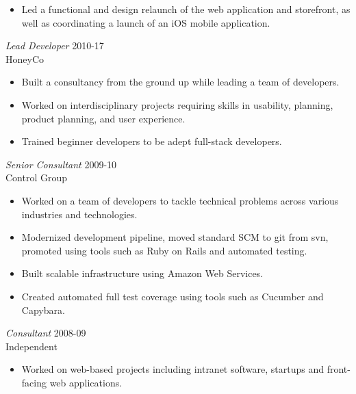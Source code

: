 \documentclass[line,margin]{res}
\begin{document}
\begin{resume}
\begin{itemize}
        \item
              Led a functional and design relaunch of the web
              application and storefront, as well as coordinating
              a launch of an iOS mobile application.
    \end{itemize}

    {\sl Lead Developer}
    \hfill 2010-17 \\
    HoneyCo
    \begin{itemize} \itemsep -2pt
        \item
              Built a consultancy from the ground up while leading
              a team of developers.

        \item
              Worked on interdisciplinary projects requiring skills in
              usability, planning, product planning, and user experience.

        \item
              Trained beginner developers to be adept full-stack developers.
    \end{itemize}

    {\sl Senior Consultant}
    \hfill 2009-10 \\
    Control Group
    \begin{itemize} \itemsep -2pt
        \item
              Worked on a team of developers to tackle technical problems across
              various industries and technologies.

        \item
              Modernized development pipeline, moved standard SCM to git from
              svn, promoted using tools such as Ruby on Rails and automated
              testing.

        \item
              Built scalable infrastructure using Amazon Web Services.

        \item
              Created automated full test coverage using tools such as Cucumber
              and Capybara.
    \end{itemize}

    \begin{samepage}
        {\sl Consultant}
        \hfill 2008-09 \\
        Independent
        \begin{itemize} \itemsep -2pt
            \item
                  Worked on web-based projects including intranet software, startups
                  and front-facing web applications.


\end{itemize}
\end{samepage}
\end{resume}
\end{document}
